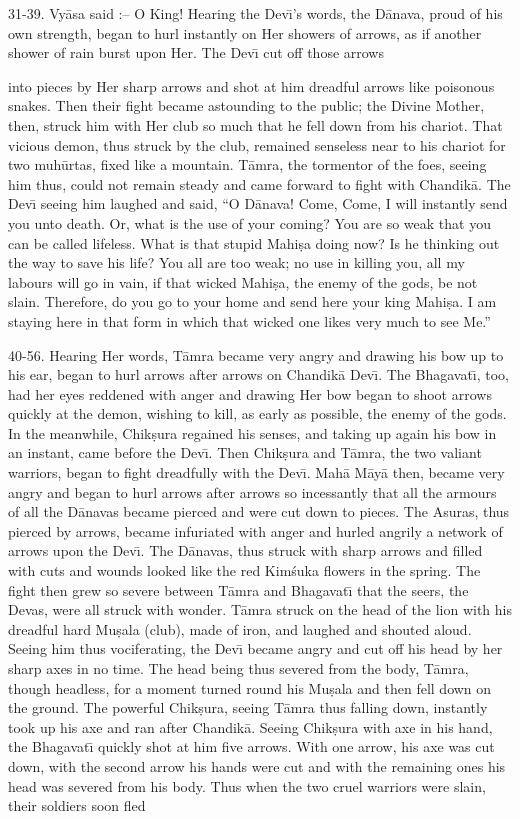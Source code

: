 31-39. Vy\=asa said :-- O King! Hearing the Dev\={\i}'s words, the D\=anava, proud of his own strength, began to hurl instantly on Her showers of arrows, as if another shower of rain burst upon Her. The Dev\={\i} cut off those arrows

into pieces by Her sharp arrows and shot at him dreadful arrows like poisonous snakes. Then their fight became astounding to the public; the Divine Mother, then, struck him with Her club so much that he fell down from his chariot. That vicious demon, thus struck by the club, remained senseless near to his chariot for two muh\=urtas, fixed like a mountain. T\=amra, the tormentor of the foes, seeing him thus, could not remain steady and came forward to fight with Chandik\=a. The Dev\={\i} seeing him laughed and said, ``O D\=anava! Come, Come, I will instantly send you unto death. Or, what is the use of your coming? You are so weak that you can be called lifeless. What is that stupid Mahi\d{s}a doing now? Is he thinking out the way to save his life? You all are too weak; no use in killing you, all my labours will go in vain, if that wicked Mahi\d{s}a, the enemy of the gods, be not slain. Therefore, do you go to your home and send here your king Mahi\d{s}a. I am staying here in that form in which that wicked one likes very much to see Me.''

40-56. Hearing Her words, T\=amra became very angry and drawing his bow up to his ear, began to hurl arrows after arrows on Chandik\=a Dev\={\i}. The Bhagavat\={\i}, too, had her eyes reddened with anger and drawing Her bow began to shoot arrows quickly at the demon, wishing to kill, as early as possible, the enemy of the gods. In the meanwhile, Chik\d{s}ura regained his senses, and taking up again his bow in an instant, came before the Dev\={\i}. Then Chik\d{s}ura and T\=amra, the two valiant warriors, began to fight dreadfully with the Dev\={\i}. Mah\=a M\=ay\=a then, became very angry and began to hurl arrows after arrows so incessantly that all the armours of all the D\=anavas became pierced and were cut down to pieces. The Asuras, thus pierced by arrows, became infuriated with anger and hurled angrily a network of arrows upon the Dev\={\i}. The D\=anavas, thus struck with sharp arrows and filled with cuts and wounds looked like the red Kim\'suka flowers in the spring. The fight then grew so severe between T\=amra and Bhagavat\={\i} that the seers, the Devas, were all struck with wonder. T\=amra struck on the head of the lion with his dreadful hard Mu\d{s}ala (club), made of iron, and laughed and shouted aloud. Seeing him thus vociferating, the Dev\={\i} became angry and cut off his head by her sharp axes in no time. The head being thus severed from the body, T\=amra, though headless, for a moment turned round his Mu\d{s}ala and then fell down on the ground. The powerful Chik\d{s}ura, seeing T\=amra thus falling down, instantly took up his axe and ran after Chandik\=a. Seeing Chik\d{s}ura with axe in his hand, the Bhagavat\={\i} quickly shot at him five arrows. With one arrow, his axe was cut down, with the second arrow his hands were cut and with the remaining ones his head was severed from his body. Thus when the two cruel warriors were slain, their soldiers soon fled

